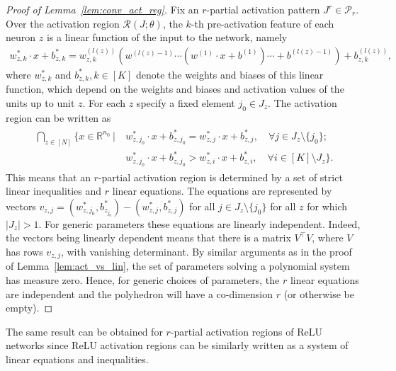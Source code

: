 \documentclass{article}
\theoremstyle{definition}
\newcommand{\nin}{n_0}
\begin{document}
\convactreglemma*
\begin{proof}[Proof of Lemma~\ref{lem:conv_act_reg}]
    Fix an $r$-partial activation pattern $J^r\in\mathcal{P}_r$.
    Over the activation region $\mathcal{R}(J;\theta)$, the $k$-th pre-activation feature of each neuron $z$ is a linear function of the input to the network, namely 
    \begin{align*}
         w^*_{z, k} \cdot x + b^*_{z, k} =  w^{(l(z))}_{z, k} (w^{(l(z) - 1)} \cdots ( w^{(1)} \cdot x + b^{(1)}) \cdots + b^{(l(z) - 1)}) + b^{(l(z))}_{z, k}, 
    \end{align*} 
    where $w^*_{z, k}$ and $b^*_{z, k}, k \in [K]$ denote the  weights and biases of this linear function, which depend on the weights and biases and activation values of the units up to unit $z$.
    For each $z$ specify a fixed element $j_0\in J_z$. 
    The activation region can be written as
    \begin{align*}
        \begin{split}
            \bigcap\limits_{z \in [N]} \big\{ x \in \mathbb{R}^{\nin} \ | \ & w^*_{z, j_0} \cdot x + b^*_{z, j_0} = w^*_{z, j} \cdot x + b^*_{z, j}, \quad \forall j \in J_z \setminus \{j_0\};\\
            &w^*_{z, j_0} \cdot x + b^*_{z, j_0} > w^*_{z, i} \cdot x + b^*_{z, i}, \quad \forall i \in [K] \setminus J_z \big\}. 
        \end{split}
    \end{align*}
    This means that an $r$-partial activation region is determined by a set of strict linear inequalities and $r$ linear equations.
    The equations are represented by vectors $v_{z,j} =(w^*_{z,j_0},b^*_{z_{j_0}})-(w^*_{z,j},b^*_{z,j})$ for all $j\in J_z\setminus\{j_0\}$ for all $z$ for which $|J_z|>1$. For generic parameters these equations are linearly independent. Indeed, the vectors being linearly dependent means that there is a matrix $V^\top V$, where $V$ has rows $v_{z,j}$, with vanishing determinant.
    By similar arguments as in the proof of Lemma~\ref{lem:act_vs_lin}, the set of parameters solving a polynomial system has measure zero.
    Hence, for generic choices of parameters, the $r$ linear equations are independent and the polyhedron will have a co-dimension $r$ (or otherwise be empty). 
\end{proof}

The same result can be obtained for $r$-partial activation regions of ReLU networks since ReLU activation regions can be similarly written as a system of linear equations and inequalities.
\end{document}
